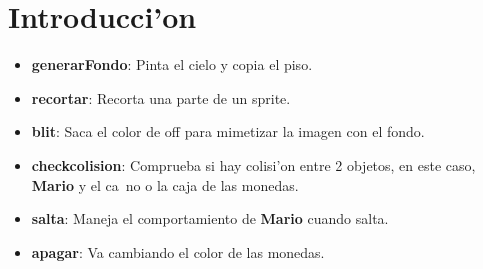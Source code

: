 \section{Introducci'on}

\begin{itemize}
	\item \textbf{generarFondo}: Pinta el cielo y copia el piso.
	\item \textbf{recortar}: Recorta una parte de un sprite.
	\item \textbf{blit}: Saca el color de off para mimetizar la imagen con el fondo.
	\item \textbf{checkcolision}: Comprueba si hay colisi'on entre 2 objetos, en este
caso, \textbf{Mario} y el ca~no o la caja de las monedas.
	\item \textbf{salta}: Maneja el comportamiento de \textbf{Mario} cuando salta.
	\item \textbf{apagar}: Va cambiando el color de las monedas.
\end{itemize}

